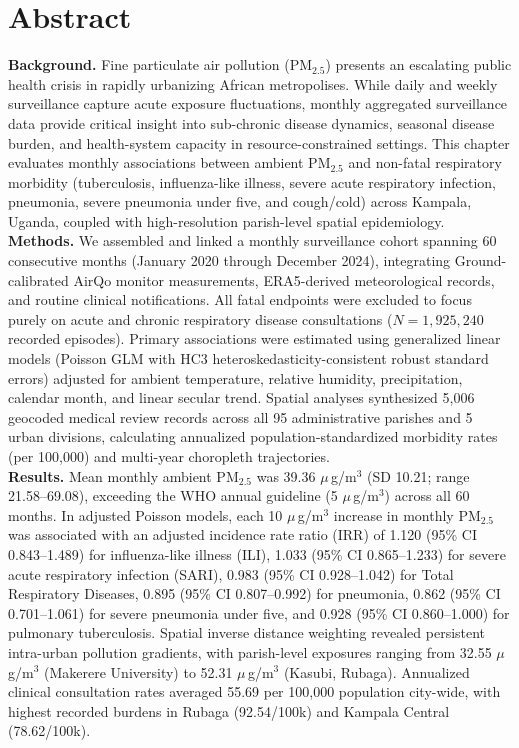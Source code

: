 \documentclass[12pt,a4paper]{report}
\newcommand{\pmfive}{PM$_{2.5}$}
\newcommand{\ugm}{\ensuremath{\mu}\,g/m$^3$}
\begin{document}
\chapter*{Abstract}
\noindent\textbf{Background.} Fine particulate air pollution (\pmfive{}) presents an escalating public health crisis in rapidly urbanizing African metropolises. While daily and weekly surveillance capture acute exposure fluctuations, monthly aggregated surveillance data provide critical insight into sub-chronic disease dynamics, seasonal disease burden, and health-system capacity in resource-constrained settings. This chapter evaluates monthly associations between ambient \pmfive{} and non-fatal respiratory morbidity (tuberculosis, influenza-like illness, severe acute respiratory infection, pneumonia, severe pneumonia under five, and cough/cold) across Kampala, Uganda, coupled with high-resolution parish-level spatial epidemiology.\\
\noindent\textbf{Methods.} We assembled and linked a monthly surveillance cohort spanning 60 consecutive months (January 2020 through December 2024), integrating Ground-calibrated AirQo monitor measurements, ERA5-derived meteorological records, and routine clinical notifications. All fatal endpoints were excluded to focus purely on acute and chronic respiratory disease consultations ($N=1,925,240$ recorded episodes). Primary associations were estimated using generalized linear models (Poisson GLM with HC3 heteroskedasticity-consistent robust standard errors) adjusted for ambient temperature, relative humidity, precipitation, calendar month, and linear secular trend. Spatial analyses synthesized 5,006 geocoded medical review records across all 95 administrative parishes and 5 urban divisions, calculating annualized population-standardized morbidity rates (per 100,000) and multi-year choropleth trajectories.\\
\noindent\textbf{Results.} Mean monthly ambient \pmfive{} was 39.36 \ugm{} (SD 10.21; range 21.58--69.08), exceeding the WHO annual guideline (5 \ugm{}) across all 60 months. In adjusted Poisson models, each 10 \ugm{} increase in monthly \pmfive{} was associated with an adjusted incidence rate ratio (IRR) of 1.120 (95\% CI 0.843--1.489) for influenza-like illness (ILI), 1.033 (95\% CI 0.865--1.233) for severe acute respiratory infection (SARI), 0.983 (95\% CI 0.928--1.042) for Total Respiratory Diseases, 0.895 (95\% CI 0.807--0.992) for pneumonia, 0.862 (95\% CI 0.701--1.061) for severe pneumonia under five, and 0.928 (95\% CI 0.860--1.000) for pulmonary tuberculosis. Spatial inverse distance weighting revealed persistent intra-urban pollution gradients, with parish-level exposures ranging from 32.55 \ugm{} (Makerere University) to 52.31 \ugm{} (Kasubi, Rubaga). Annualized clinical consultation rates averaged 55.69 per 100,000 population city-wide, with highest recorded burdens in Rubaga (92.54/100k) and Kampala Central (78.62/100k).\\
\end{document}
